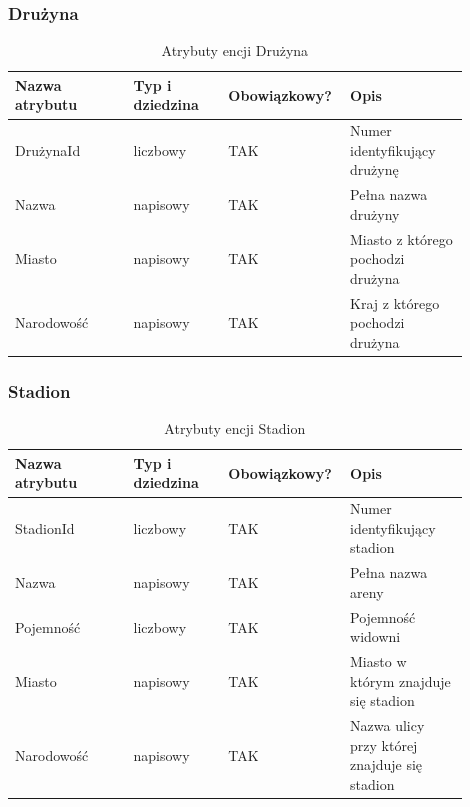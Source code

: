 \documentclass{mwrep}
\begin{document}
\vspace{1cm}

\subsubsection{Drużyna}
\begin{table}[H]
	\begin{tabular}{|p{0.25\linewidth}|p{0.2\linewidth}|p{0.2\linewidth}|p{0.25\linewidth}|}
	\hline
	Nazwa atrybutu & Typ i dziedzina & Obowiązkowy? & Opis                                                           \\ \hline
	DrużynaId   & liczbowy                            & TAK                              & Numer identyfikujący drużynę                                                   \\ \hline
	Nazwa         & napisowy                           & TAK                              & Pełna nazwa drużyny         \\ \hline
	Miasto          & napisowy                            & TAK                              & Miasto z którego pochodzi drużyna                        \\ \hline
	Narodowość           & napisowy                            & TAK                              & Kraj z którego pochodzi drużyna                 \\ \hline
	\end{tabular}
	\caption{Atrybuty encji Drużyna}
\end{table}

\vspace{1cm}

\subsubsection{Stadion}
\begin{table}[H]
	\begin{tabular}{|p{0.25\linewidth}|p{0.2\linewidth}|p{0.2\linewidth}|p{0.25\linewidth}|}
	\hline
	Nazwa atrybutu & Typ i dziedzina & Obowiązkowy? & Opis                                                           \\ \hline
	StadionId   & liczbowy                            & TAK                              & Numer identyfikujący stadion                                                   \\ \hline
	Nazwa         & napisowy                           & TAK                              & Pełna nazwa areny         \\ \hline
	Pojemność 	   & liczbowy							& TAK								& Pojemność widowni \\  \hline
	Miasto          & napisowy                            & TAK                              & Miasto w którym znajduje się stadion                       \\ \hline
	Narodowość           & napisowy                            & TAK                              & Nazwa ulicy przy której znajduje się stadion   \\ \hline
	\end{tabular}
	\caption{Atrybuty encji Stadion}
\end{table}
\end{document}
